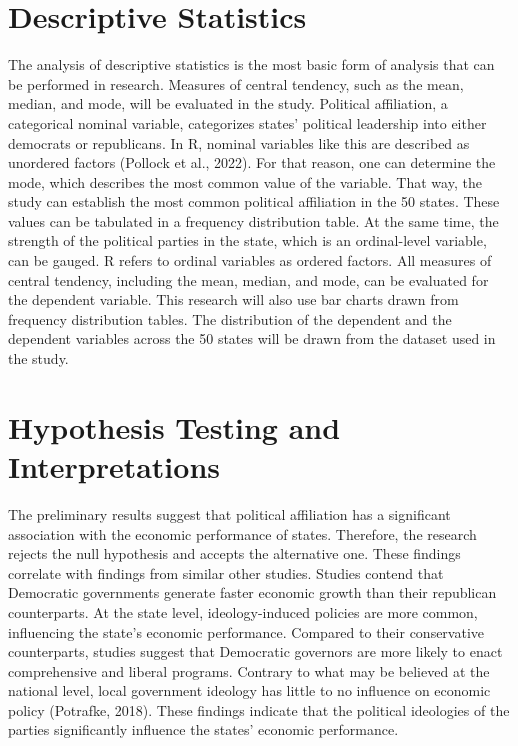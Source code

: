 \documentclass[11pt]{article}
\begin{document}
\section{Descriptive Statistics}

The analysis of descriptive statistics is the most basic form of analysis that can be performed in research. Measures of central tendency, such as the mean, median, and mode, will be evaluated in the study. Political affiliation, a categorical nominal variable, categorizes states' political leadership into either democrats or republicans. In R, nominal variables like this are described as unordered factors (Pollock et al., 2022). For that reason, one can determine the mode, which describes the most common value of the variable. That way, the study can establish the most common political affiliation in the 50 states. These values can be tabulated in a frequency distribution table. At the same time, the strength of the political parties in the state, which is an ordinal-level variable, can be gauged. R refers to ordinal variables as ordered factors. All measures of central tendency, including the mean, median, and mode, can be evaluated for the dependent variable. This research will also use bar charts drawn from frequency distribution tables. The distribution of the dependent and the dependent variables across the 50 states will be drawn from the dataset used in the study.

\section{Hypothesis Testing and Interpretations}

The preliminary results suggest that political affiliation has a significant association with the economic performance of states. Therefore, the research rejects the null hypothesis and accepts the alternative one. These findings correlate with findings from similar other studies. Studies contend that Democratic governments generate faster economic growth than their republican counterparts. At the state level, ideology-induced policies are more common, influencing the state's economic performance. Compared to their conservative counterparts, studies suggest that Democratic governors are more likely to enact comprehensive and liberal programs. Contrary to what may be believed at the national level, local government ideology has little to no influence on economic policy (Potrafke, 2018). These findings indicate that the political ideologies of the parties significantly influence the states' economic performance.
\end{document}
